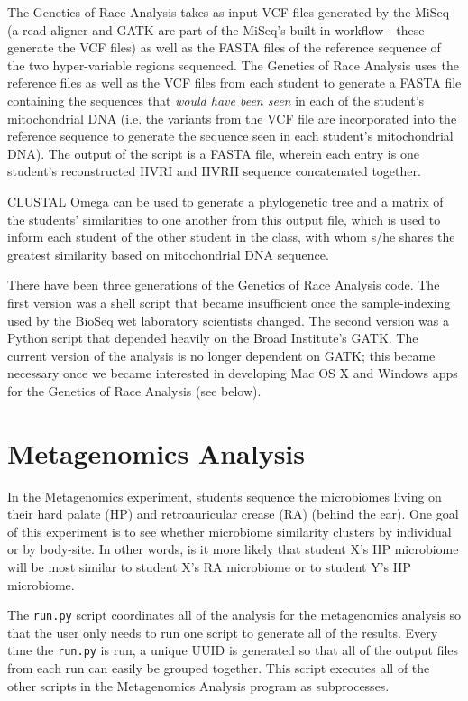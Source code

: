 \documentclass{report}
\begin{document}
The Genetics of Race Analysis takes as input VCF files generated by the MiSeq (a read aligner and GATK are part of the MiSeq's built-in workflow - these generate the VCF files) as well as the FASTA files of the reference sequence of the two hyper-variable regions sequenced. The Genetics of Race Analysis uses the reference files as well as the VCF files from each student to generate a FASTA file containing the sequences that \emph{would have been seen} in each of the student's mitochondrial DNA (i.e. the variants from the VCF file are incorporated into the reference sequence to generate the sequence seen in each student's mitochondrial DNA). The output of the script is a FASTA file, wherein each entry is one student's reconstructed HVRI and HVRII sequence concatenated together.

CLUSTAL Omega can be used to generate a phylogenetic tree and a matrix of the students' similarities to one another from this output file, which is used to inform each student of the other student in the class, with whom s/he shares the greatest similarity based on mitochondrial DNA sequence.

There have been three generations of the Genetics of Race Analysis code. The first version was a shell script that became insufficient once the sample-indexing used by the BioSeq wet laboratory scientists changed. The second version was a Python script that depended heavily on the Broad Institute's GATK. The current version of the analysis is no longer dependent on GATK; this became necessary once we became interested in developing Mac OS X and Windows apps for the Genetics of Race Analysis (see below).

\section{Metagenomics Analysis}

\noindent In the Metagenomics experiment, students sequence the microbiomes living on their hard palate (HP) and retroauricular crease (RA) (behind the ear). One goal of this experiment is to see whether microbiome similarity clusters by individual or by body-site. In other words, is it more likely that student X's HP microbiome will be most similar to student X's RA microbiome or to student Y's HP microbiome.

The \texttt{run.py} script coordinates all of the analysis for the metagenomics analysis so that the user only needs to run one script to generate all of the results. Every time the \texttt{run.py} is run, a unique UUID is generated so that all of the output files from each run can easily be grouped together. This script executes all of the other scripts in the Metagenomics Analysis program as subprocesses.
\end{document}
